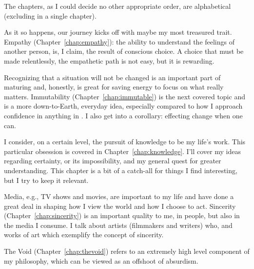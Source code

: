 \documentclass[./butidigress.tex]{subfiles}
\begin{document}
The chapters, as I could decide no other appropriate order, are alphabetical (excluding  in a single chapter).

As it so happens, our journey kicks off with maybe my most treasured trait.
Empathy (Chapter~\ref{chap:empathy}): the ability to understand the feelings of another person, is, I claim, the result of conscious choice.
A choice that must be made relentlessly, the empathetic path is not easy, but it is rewarding.

Recognizing that a situation will not be changed is an important part of maturing and, honestly, is great for saving energy to focus on what really matters.
Immutability (Chapter~\ref{chap:immutable}) is the next covered topic and is a more down-to-Earth, everyday idea, especially compared to how I approach confidence in anything in .
I also get into a corollary: effecting change when one can.

I consider, on a certain level, the pursuit of knowledge to be my life's work.
This particular obsession is covered in Chapter~\ref{chap:knowledge}.
I'll cover my ideas regarding certainty, or its impossibility, and my general quest for greater understanding.
This chapter is a bit of a catch-all for things I find interesting, but I try to keep it relevant.

Media, e.g., TV shows and movies, are important to my life and have done a great deal in shaping how I view the world and how I choose to act.
Sincerity (Chapter~\ref{chap:sincerity}) is an important quality to me, in people, but also in the media I consume.
I talk about artists (filmmakers and writers) who, and works of art which exemplify the concept of sincerity.

The Void (Chapter~\ref{chap:thevoid}) refers to an extremely high level component of my philosophy, which can be viewed as an offshoot of absurdism.
\end{document}
